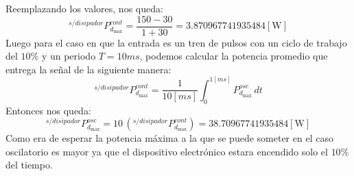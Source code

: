 Reemplazando los valores, nos queda:
\begin{equation}
   ^{s/disipador}P_{d_{\max}}^{cont} = \dfrac{150 - 30}{1 + 30} = 3.870967741935484 [\si{\watt}]
   \label{eq:potencia_max}
\end{equation}
Luego para el caso en que la entrada es un tren de pulsos con un ciclo de trabajo del $10\%$ y un periodo $T=10ms$, podemos calcular la potencia promedio
que entrega la señal de la siguiente manera:
\begin{equation}
   ^{s/disipador}P_{d_{\max}}^{cont}=\frac{1}{10[\si{ms}]}\int_0^{1[\si{ms}]}P_{d_{\max}}^{osc}\,dt
\end{equation}
Entonces nos queda:
\begin{equation}
   ^{s/disipador}P_{d_{\max}}^{osc}=10\,(^{s/disipador}P_{d_{\max}}^{cont})=38.70967741935484[\si{\watt}]
\end{equation}
Como era de esperar la potencia máxima a la que se puede someter en el caso oscilatorio es mayor ya que el dispositivo electrónico estara encendido solo el $10\%$
del tiempo.

